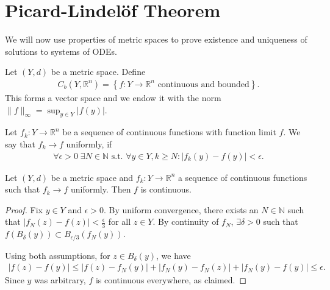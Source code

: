 \section{Picard-Lindelöf Theorem}

We will now use properties of metric spaces to prove existence and uniqueness of solutions to systems of ODEs.


\begin{definition}\label{def:space-cont-bdd}
    Let $(Y, d)$ be a metric space. Define 
    \begin{align*}
        C_{b}(Y, \mathbb{R}^{n}) = \left\{ f: Y \to \mathbb{R}^{n} \text{ continuous and bounded} \right\}.
    \end{align*}
    This forms a vector space and we endow it with the norm $\lVert f \rVert_{\infty} = \sup_{y \in Y} \left| f(y) \right|$. 
\end{definition}

\begin{definition}\label{def:unif-conv}
    Let $f_{k}: Y \to \mathbb{R}^{n}$ be a sequence of continuous functions with function limit $f$. We say that $f_{k} \to f$ uniformly, if 
    \begin{align*}
        \forall \epsilon > 0 \; \exists N \in \mathbb{N} \text{ s.t. } \forall y \in Y, k \geq N: \left| f_{k}(y) - f(y) \right| < \epsilon.
    \end{align*}
\end{definition}

\begin{lemma}\label{lem:unif-lim-cont}
    Let $(Y, d)$ be a metric space and $f_{k}: Y \to \mathbb{R}^{n}$ a sequence of continuous functions such that $f_{k} \to f$ uniformly. Then $f$ is continuous. 
\end{lemma}
\begin{proof}
    Fix $y \in Y$ and $\epsilon > 0$. By uniform convergence, there exists an $N \in \mathbb{N}$ such that $\left| f_{N}(z) - f(z) \right| < \frac{\epsilon}{3}$ for all $z \in Y$. By continuity of $f_{N}$, $\exists \delta > 0$ such that $f(B_{\delta}(y)) \subset B_{\epsilon / 3}(f_{N}(y))$. 

    Using both assumptions, for $z \in B_{\delta}(y)$, we have
    \begin{align*}
        \left| f(z) - f(y) \right| \leq \left| f(z) - f_{N}(y) \right| + \left| f_{N}(y) - f_{N}(z) \right| + \left| f_{N}(y) - f(y) \right| \leq \epsilon.
    \end{align*}
    Since $y$ was arbitrary, $f$ is continuous everywhere, as claimed.
\end{proof}

